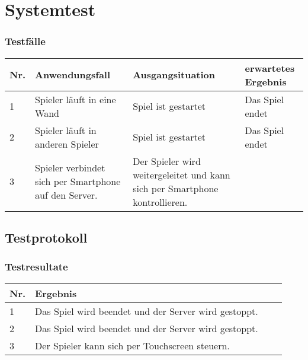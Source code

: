 \section{Systemtest}
\subsubsection{Testfälle}
\begin{tabularx}{\textwidth}{| X | X | X | X |}
    \hline
    Nr. & Anwendungsfall & Ausgangsituation & erwartetes Ergebnis \\
    \hline
    1 & Spieler läuft in eine Wand & Spiel ist gestartet & Das Spiel endet \\
    \hline
    2  & Spieler läuft in anderen Spieler & Spiel ist gestartet & Das Spiel endet\\
    \hline
    3 & Spieler verbindet sich per Smartphone auf den Server. & Der Spieler wird weitergeleitet und kann sich per Smartphone kontrollieren.\\
    \hline
\end{tabularx}
\subsection{Testprotokoll}
\subsubsection{Testresultate}
\begin{tabularx}{\textwidth}{| X | X | X | X |}
    \hline
    Nr. & Ergebnis \\
    \hline
    1 & Das Spiel wird beendet und der Server wird gestoppt.\\
    \hline
    2  & Das Spiel wird beendet und der Server wird gestoppt.\\
    \hline
    3 & Der Spieler kann sich per Touchscreen steuern.\\
    \hline
\end{tabularx}
